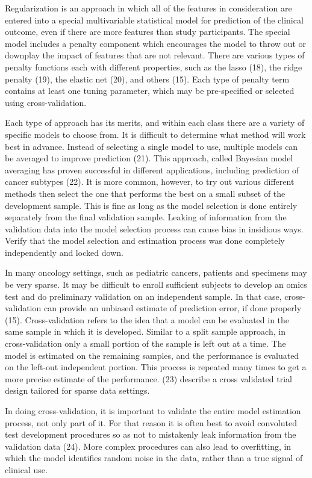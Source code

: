 \documentclass[11pt]{article}
\begin{document}
Regularization is an approach in which all of the features in
consideration are entered into a special multivariable statistical model
for prediction of the clinical outcome, even if there are more features
than study participants. The special model includes a penalty component
which encourages the model to throw out or downplay the impact of
features that are not relevant. There are various types of penalty
functions each with different properties, such as the lasso (18), the
ridge penalty (19), the elastic net (20), and others (15). Each type of
penalty term contains at least one tuning parameter, which may be
pre-specified or selected using cross-validation.

Each type of approach has its merits, and within each class there are a
variety of specific models to choose from. It is difficult to determine
what method will work best in advance. Instead of selecting a single
model to use, multiple models can be averaged to improve prediction
(21). This approach, called Bayesian model averaging has proven
successful in different applications, including prediction of cancer
subtypes (22). It is more common, however, to try out various different
methods then select the one that performs the best on a small subset of
the development sample. This is fine as long as the model selection is
done entirely separately from the final validation sample. Leaking of
information from the validation data into the model selection process
can cause bias in insidious ways. Verify that the model selection and
estimation process was done completely independently and locked down.

In many oncology settings, such as pediatric cancers, patients and
specimens may be very sparse. It may be difficult to enroll sufficient
subjects to develop an omics test and do preliminary validation on an
independent sample. In that case, cross-validation can provide an
unbiased estimate of prediction error, if done properly (15).
Cross-validation refers to the idea that a model can be evaluated in the
same sample in which it is developed. Similar to a split sample
approach, in cross-validation only a small portion of the sample is left
out at a time. The model is estimated on the remaining samples, and the
performance is evaluated on the left-out independent portion. This
process is repeated many times to get a more precise estimate of the
performance. (23) describe a cross validated trial design tailored for
sparse data settings.

In doing cross-validation, it is important to validate the entire model
estimation process, not only part of it. For that reason it is often
best to avoid convoluted test development procedures so as not to
mistakenly leak information from the validation data (24). More complex
procedures can also lead to overfitting, in which the model identifies
random noise in the data, rather than a true signal of clinical use.
\end{document}
